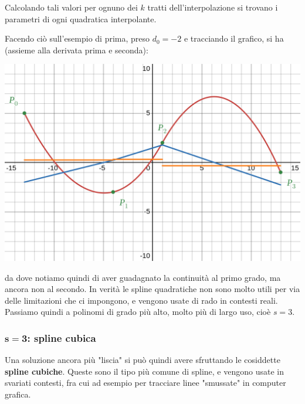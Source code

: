 \documentclass[a4paper,11pt]{article}
\begin{document}
Calcolando tali valori per ognuno dei $k$ tratti dell'interpolazione si trovano i parametri di ogni quadratica interpolante.

\newpage

Facendo ciò sull'esempio di prima, preso $d_0 = -2$ e tracciando il grafico, si ha (assieme alla derivata prima e seconda):
\begin{center}
	\includegraphics[scale=0.3]{../figures/multipoly_2.png}
\end{center}
da dove notiamo quindi di aver guadagnato la continuità al primo grado, ma ancora non al secondo.
In verità le spline quadratiche non sono molto utili per via delle limitazioni che ci impongono, e vengono usate di rado in contesti reali.
Passiamo quindi a polinomi di grado più alto, molto più di largo uso, cioè $s = 3$.

\subsubsection{$\mathbf{s = 3}$: spline cubica}
Una soluzione ancora più "liscia" si può quindi avere sfruttando le cosiddette \textbf{spline cubiche}.
Queste sono il tipo più comune di spline, e vengono usate in svariati contesti, fra cui ad esempio per tracciare linee "smussate" in computer grafica.
\end{document}
